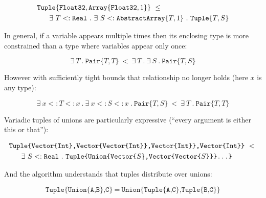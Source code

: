 \vspace{-3ex}
\begin{singlespace}
\begin{align*}
&\texttt{Tuple}\{\texttt{Float32},\texttt{Array}\{\texttt{Float32},1\}\}\ \leq\ \\
&\hspace{4ex}\exists\ T<:\texttt{Real}\ .\ \exists\ S<:\texttt{AbstractArray}\{T,1\}\ .\ \texttt{Tuple}\{T,S\}
\end{align*}
\end{singlespace}


\noindent
In general, if a variable appears multiple times then its enclosing type is
more constrained than a type where variables appear only once:

\vspace{-3ex}
\[
\exists\ T\ .\ \texttt{Pair}\{T,T\}\ <\ \exists\ T\ .\ \exists\ S\ .\ \texttt{Pair}\{T,S\}
\]

\noindent
However with sufficiently tight bounds that relationship no longer holds
(here $x$ is any type):

\vspace{-3ex}
\[
\exists\ x<:T<:x\ .\ \exists\ x<:S<:x\ .\ \texttt{Pair}\{T,S\}\ <\ \exists\ T\ .\ \texttt{Pair}\{T,T\}
\]


\noindent
Variadic tuples of unions are particularly expressive (``every argument is
either this or that''):

\vspace{-3ex}
\begin{singlespace}
\begin{align*}
&\texttt{Tuple\{Vector\{Int\},Vector\{Vector\{Int\}\},Vector\{Int\}\},Vector\{Int\}\}}\ <\ \\
&\hspace{4ex}\exists\ S<:\texttt{Real}\ .\ \texttt{Tuple\{Union\{Vector\{}S\}\texttt{,Vector\{Vector\{}S\texttt{\}\}\}...\}}
\end{align*}
\end{singlespace}

\noindent
And the algorithm understands that tuples distribute over unions:

\vspace{-3ex}
\[
\texttt{Tuple\{Union\{A,B\},C\}}\ =\ \texttt{Union\{Tuple\{A,C\},Tuple\{B,C\}\}}
\]

